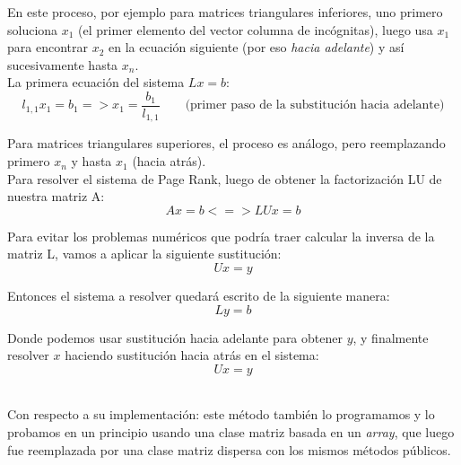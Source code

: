 			En este proceso, por ejemplo para matrices triangulares inferiores, uno primero soluciona $x_1$ (el primer elemento del vector columna de incógnitas), luego usa $x_1$ para encontrar $x_2$ en la ecuación siguiente (por eso \textit{hacia adelante}) y así sucesivamente hasta $x_n$. \\

			La primera ecuación del sistema $Lx = b$: \\

			\begin{equation}
				l_{1,1} x_{1} = b_{1} => x_{1} = \frac{b_{1}}{l_{1,1}} \qquad \text{(primer paso de la substitución hacia adelante)}
			\end{equation}

			Para matrices triangulares superiores, el proceso es análogo, pero reemplazando primero $x_n$ y hasta $x_1$ (hacia atrás). \\

			Para resolver el sistema de Page Rank, luego de obtener la factorización LU de nuestra matriz A: \\

			\begin{equation}
				Ax = b <=> LUx = b
			\end{equation}

			Para evitar los problemas numéricos que podría traer calcular la inversa de la matriz L, vamos a aplicar la siguiente sustitución: \\

			\begin{equation}
				Ux = y
			\end{equation}

			Entonces el sistema a resolver quedará escrito de la siguiente manera: \\

			\begin{equation}
				Ly = b
			\end{equation}

			Donde podemos usar sustitución hacia adelante para obtener $y$, y finalmente resolver $x$ haciendo sustitución hacia atrás en el sistema: \\

			\begin{equation}
				Ux = y
			\end{equation}

			\quad \\

				Con respecto a su implementación: este método también lo programamos y lo probamos en un principio usando una clase matriz basada en un \textit{array}, que luego fue reemplazada por una clase matriz dispersa con los mismos métodos públicos. \\

